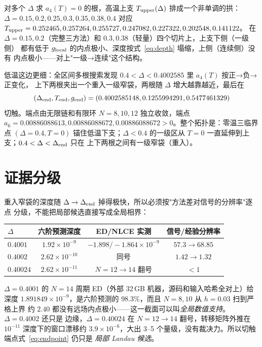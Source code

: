 \documentclass[UTF8,11pt,a4paper]{ctexart}
\begin{document}
对多个 $\Delta$ 求 $a_4(T)=0$ 的根，高温上支 $T_{\rm upper}(\Delta)$ 排成一个非单调的拱：
$\Delta=0.15,0.2,0.25,0.3,0.35,0.38,0.4$ 对应
$T_{\rm upper}=0.252465,0.257264,0.255727,0.247082,0.227322,0.202548,0.141122$。
在 $\Delta=0.15,0.2$（完整三方法）和 $0.3,0.38$（轻量）四个切片上，上支下侧（一级侧）
都有低于 $g_{\rm local}$ 的内点极小、深度按式~\eqref{eq:depth} 塌缩，上侧（连续侧）没有
内点极小——对上"一级→连续"这个结构。

低温这边更细：全区间多根搜索发现 $0.4<\Delta<0.4002585$ 里 $a_4(T)$ 按正→负→正变化，
上下两根夹出一个重入一级窄袋，两根随 $\Delta$ 增大越靠越近，最后在
\begin{equation}
  (\Delta_{\rm end},T_{\rm end},g_{\rm end})=(0.4002585148,0.1255994291,0.5477461329)
  \label{eq:endpoint}
\end{equation}
切触。端点由无限链和有限环 $N=8,10,12$ 独立收敛，端点
$a_6=0.00886088613,0.00886088672,0.00886088672>0$。整个拓扑是：零温三临界点 $(\Delta=0.4,T=0)$
锚住低温下支；$\Delta<0.4$ 的一级区从 $T=0$ 一直延伸到上支；$0.4<\Delta<\Delta_{\rm end}$ 只在
上下两根之间有一级窄袋（重入）。

\section{证据分级}

重入窄袋的深度随 $\Delta\to\Delta_{\rm end}$ 掉得极快，所以必须按"方法差对信号的分辨率"逐点
分级，不能把局部候选直接写成全局相界：

\begin{center}
\begin{tabular}{lccc}
\toprule
$\Delta$ & 六阶预测深度 & ED/NLCE 实测 & 信号/经验分辨率 \\
\midrule
$0.4001$ & $1.92\times10^{-9}$ & $-1.898/-1.864\times10^{-9}$ & $57.3\to68.85$ \\
$0.4002$ & $2.62\times10^{-10}$ & 同号 & $1.42\to1.32$ \\
$0.40024$ & $2.62\times10^{-11}$ & $N=12\to14$ 翻号 & $<1$ \\
\bottomrule
\end{tabular}
\end{center}

$\Delta=0.4001$ 的 $N=14$ 周期 ED（外部 32\,GB 机器，源码和输入哈希全对上）给深度
$1.891849\times10^{-9}$，是六阶预测的 $98.3\%$，而且 $N=8,10$ 从 $h=0.03$ 扫到严格上界
约 $2.40$ 都没有远场内点极小——这一截面可以叫\emph{全局数值支持}。$\Delta=0.4002$ 还只是
边缘，$\Delta=0.40024$ 在 $N=12\to14$ 翻号，转移矩阵外推在 $10^{-11}$ 深度下的窗口漂移约
$3.9\times10^{-6}$，大出 3--5 个量级，没有裁决力。所以切触端点式~\eqref{eq:endpoint} 仍只是
\emph{局部 Landau 候选}。
\end{document}
